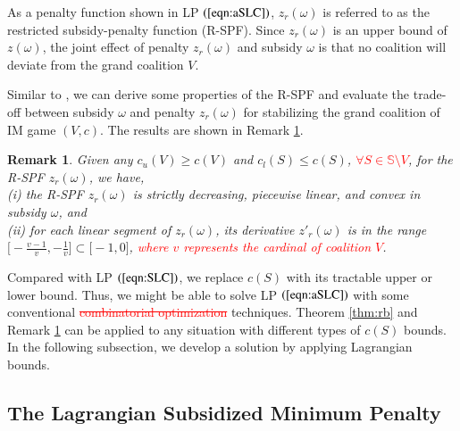 \documentclass[authoryear,review,12pt]{elsarticle}
\newtheorem{remark}{Remark}
\begin{document}
As a penalty function shown in LP $(\ref{eqn:aSLC})$, $z_r(\omega)$ is referred to as the restricted subsidy-penalty function (R-SPF).
Since $z_r(\omega)$ is an upper bound of $z(\omega)$, the joint effect of penalty $z_r(\omega)$ and subsidy $\omega$ is that no coalition will deviate from the grand coalition $V$.


Similar to \cite{leastcore2018}, we can derive some properties of the R-SPF and evaluate the trade-off between subsidy $\omega$ and penalty $z_r(\omega)$ for stabilizing the grand coalition of IM game $(V,c)$.
The results are shown in Remark \ref{rem:convex}.

\begin{remark}\label{rem:convex}
Given any $c_u(V) \geq c(V)$ and $c_l(S) \leq c(S)$, \textcolor{red}{$\forall S \in \mathbb{S} \setminus V$}, for the R-SPF $z_r(\omega)$, we have,\\
(i) the R-SPF $z_r(\omega)$ is strictly decreasing, piecewise linear, and convex in subsidy $\omega$, and\\
(ii) for each linear segment of $z_r(\omega)$, its derivative $z'_r(\omega)$ is in the range $\big[ -\frac{v-1}{v}, -\frac{1}{v} \big] \subset \big[-1,0\big]$, \textcolor{red}{where $v$ represents the cardinal of coalition $V$}.
\end{remark}


Compared with LP $(\ref{eqn:SLC})$, we replace $c(S)$ with its tractable upper or lower bound. Thus, we might be able to solve LP $(\ref{eqn:aSLC})$ with some conventional
\textcolor{red}{\st{combinatorial optimization}}
techniques.
Theorem \ref{thm:rb} and Remark \ref{rem:convex} can be applied to any situation with different types of $c(S)$ bounds.
In the following subsection, we develop a solution by applying Lagrangian bounds.


\subsection{The Lagrangian Subsidized Minimum Penalty}\label{section:CGBAM}
\end{document}
